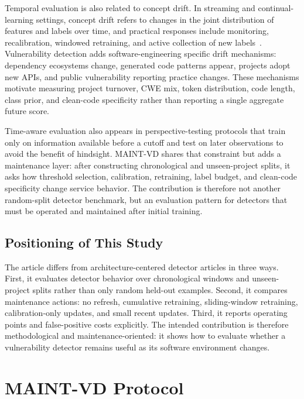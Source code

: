 \documentclass[a4paper,fleqn]{cas-dc}
\begin{document}
Temporal evaluation is also related to concept drift. In streaming and
continual-learning settings, concept drift refers to changes in the joint
distribution of features and labels over time, and practical responses include
monitoring, recalibration, windowed retraining, and active collection of new
labels~\cite{gama2014drift}. Vulnerability detection adds software-engineering
specific drift mechanisms: dependency ecosystems change, generated code
patterns appear, projects adopt new APIs, and public vulnerability reporting
practice changes. These mechanisms motivate measuring project turnover, CWE
mix, token distribution, code length, class prior, and clean-code specificity
rather than reporting a single aggregate future score.

Time-aware evaluation also appears in perspective-testing protocols that train
only on information available before a cutoff and test on later observations to
avoid the benefit of hindsight. MAINT-VD shares that constraint but adds a
maintenance layer: after constructing chronological and unseen-project splits,
it asks how threshold selection, calibration, retraining, label budget, and
clean-code specificity change service behavior. The contribution is therefore
not another random-split detector benchmark, but an evaluation pattern for
detectors that must be operated and maintained after initial training.

\subsection{Positioning of This Study}

The article differs from architecture-centered detector articles in three ways.
First, it evaluates detector behavior over chronological windows and
unseen-project splits rather than only random held-out examples. Second, it
compares maintenance actions: no refresh, cumulative retraining,
sliding-window retraining, calibration-only updates, and small recent updates.
Third, it reports operating points and false-positive costs explicitly. The
intended contribution is therefore methodological and maintenance-oriented:
it shows how to evaluate whether a vulnerability detector remains useful as its
software environment changes.

\section{MAINT-VD Protocol}
\end{document}
